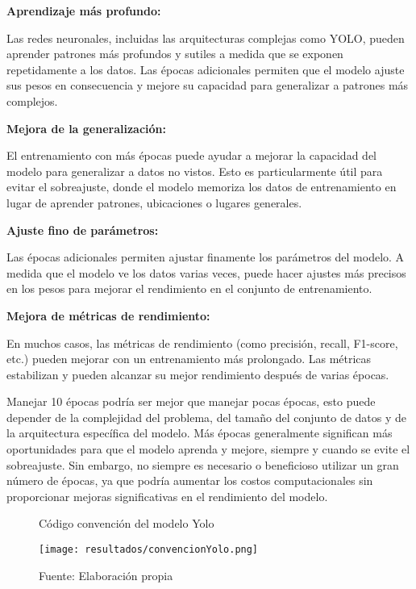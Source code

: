 \newpage

\textbf{Aprendizaje más profundo:}

Las redes neuronales, incluidas las arquitecturas complejas como YOLO, pueden aprender patrones más profundos y sutiles a medida que se exponen repetidamente a los datos. Las épocas adicionales permiten que el modelo ajuste sus pesos en consecuencia y mejore su capacidad para generalizar a patrones más complejos. \newline

\textbf{Mejora de la generalización:}

El entrenamiento con más épocas puede ayudar a mejorar la capacidad del modelo para generalizar a datos no vistos. Esto es particularmente útil para evitar el sobreajuste, donde el modelo memoriza los datos de entrenamiento en lugar de aprender patrones, ubicaciones o lugares generales. \newline

\textbf{Ajuste fino de parámetros:}

Las épocas adicionales permiten ajustar finamente los parámetros del modelo. A medida que el modelo ve los datos varias veces, puede hacer ajustes más precisos en los pesos para mejorar el rendimiento en el conjunto de entrenamiento. \newline

\textbf{Mejora de métricas de rendimiento:}

En muchos casos, las métricas de rendimiento (como precisión, recall, F1-score, etc.) pueden mejorar con un entrenamiento más prolongado. Las métricas estabilizan y pueden alcanzar su mejor rendimiento después de varias épocas.

\newpage

Manejar 10 épocas podría ser mejor que manejar pocas épocas, esto puede depender de la complejidad del problema, del tamaño del conjunto de datos y de la arquitectura específica del modelo. Más épocas generalmente significan más oportunidades para que el modelo aprenda y mejore, siempre y cuando se evite el sobreajuste. Sin embargo, no siempre es necesario o beneficioso utilizar un gran número de épocas, ya que podría aumentar los costos computacionales sin proporcionar mejoras significativas en el rendimiento del modelo.

\begin{figure}[h]
\centering
\caption{Código convención del modelo Yolo}
\texttt{[image: resultados/convencionYolo.png]}
\caption*{\footnotesize Fuente: Elaboración propia}
\label{fig:figuraConvencionYolo}
\end{figure}

